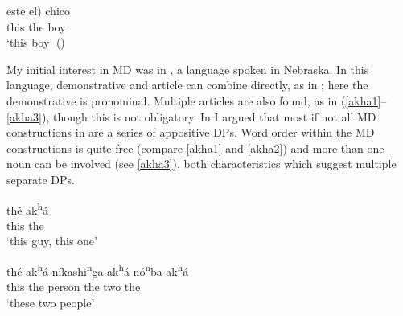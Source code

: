 \documentclass[output=paper]{langscibook}
\begin{document}
\ex
\gll este \minsp{(*} el) chico \\
    this {} the boy \\     %
\glt `this  boy' \hfill ()
\z
\z

 \noindent My initial interest in MD was in , a  language spoken in Nebraska. In this language, demonstrative and article can combine directly, as in ; here the demonstrative is pronominal. Multiple articles are also found, as in (\ref{akha1}--\ref{akha3}), though this is not obligatory. In \citet{Rudin1993} I argued that most if not all MD constructions in  are a series of appositive DPs. Word order within the MD constructions is quite free (compare \ref{akha1} and \ref{akha2}) and more than one noun can be involved (see \ref{akha3}), both characteristics which suggest multiple separate DPs.







\ea \label{ex:Omaha}
\ea \label{thisguy}
\gll thé ak\textsuperscript{h}á \\
     this the\\
     \glt `this  guy, this one' %

\ex \label{akha1}
\gll thé ak\textsuperscript{h}á níkashi\textsuperscript{n}ga ak\textsuperscript{h}á nó\textsuperscript{n}ba ak\textsuperscript{h}á\\
    this the person the two the \\
\glt `these two people'
\end{document}
